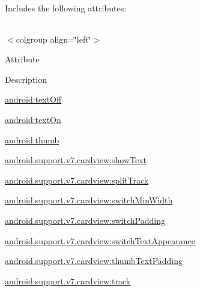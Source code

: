 Includes the following attributes\+:

\tabulinesep=1mm
\begin{longtabu} spread 0pt [c]{*{0}{|X[-1]}|}
\hline
\end{longtabu}
$<$colgroup align=\char`\"{}left\char`\"{}$>$ 

Attribute

Description 

{\ttfamily \hyperlink{classandroid_1_1support_1_1v7_1_1cardview_1_1R_1_1styleable_a1bc9b7fb068e2c5acdee2d1f23283c6e}{android\+:text\+Off}}

{\ttfamily \hyperlink{classandroid_1_1support_1_1v7_1_1cardview_1_1R_1_1styleable_a0aca0706e8d4b21ec30c7df58ce31033}{android\+:text\+On}}

{\ttfamily \hyperlink{classandroid_1_1support_1_1v7_1_1cardview_1_1R_1_1styleable_a3a27aac17c76def284b1d0b7610ccc61}{android\+:thumb}}

{\ttfamily \hyperlink{classandroid_1_1support_1_1v7_1_1cardview_1_1R_1_1styleable_ad2a7ec0499f9c6b3a7bfda457a82be97}{android.\+support.\+v7.\+cardview\+:show\+Text}}

{\ttfamily \hyperlink{classandroid_1_1support_1_1v7_1_1cardview_1_1R_1_1styleable_adb2fe94b52e4196f86533c6c9620503e}{android.\+support.\+v7.\+cardview\+:split\+Track}}

{\ttfamily \hyperlink{classandroid_1_1support_1_1v7_1_1cardview_1_1R_1_1styleable_ae69add4745baa57c245f73ea9040dcec}{android.\+support.\+v7.\+cardview\+:switch\+Min\+Width}}

{\ttfamily \hyperlink{classandroid_1_1support_1_1v7_1_1cardview_1_1R_1_1styleable_a282efd9317f1b44049acf1c53d892763}{android.\+support.\+v7.\+cardview\+:switch\+Padding}}

{\ttfamily \hyperlink{classandroid_1_1support_1_1v7_1_1cardview_1_1R_1_1styleable_aee6b23536fd36623a9dd00ddd13596e8}{android.\+support.\+v7.\+cardview\+:switch\+Text\+Appearance}}

{\ttfamily \hyperlink{classandroid_1_1support_1_1v7_1_1cardview_1_1R_1_1styleable_ab38025adbf83386aabd5df58f36bd8cb}{android.\+support.\+v7.\+cardview\+:thumb\+Text\+Padding}}

{\ttfamily \hyperlink{classandroid_1_1support_1_1v7_1_1cardview_1_1R_1_1styleable_a0694f9f648cee027249017c5733efdb5}{android.\+support.\+v7.\+cardview\+:track}}

